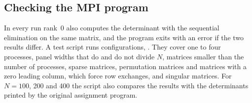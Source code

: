 \subsection{Checking the MPI program}

In every run rank~0 also computes the determinant with the sequential elimination on the
same matrix, and the program exits with an error if the two results differ. A test script
runs \MpiTestCount{} configurations, \MpiTestVerdict. They cover one to four processes,
panel widths that do and do not divide $N$, matrices smaller than the number of processes,
sparse matrices, permutation matrices and matrices with a zero leading column, which force
row exchanges, and singular matrices. For $N = 100$, 200 and 400 the script also compares
the results with the determinants printed by the original assignment program.
